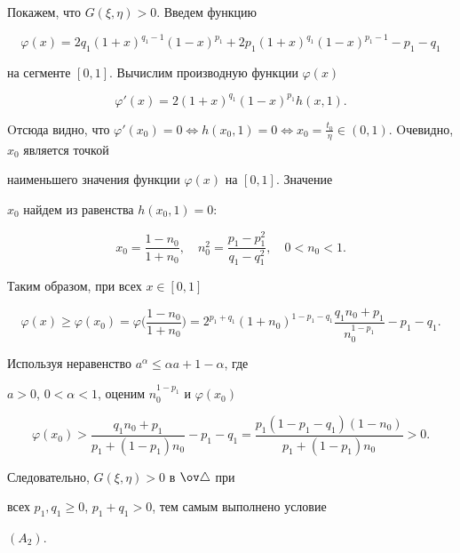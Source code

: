 Покажем, что $G(\xi,\eta)>0$. Введем функцию


$$


\varphi(x)=2q_1(1+x)^{q_1-1}(1-x)^{p_1}+


2p_1(1+x)^{q_1}(1-x)^{p_1-1}-p_1-q_1


$$


на сегменте $[0,1]$. Вычислим производную функции $\varphi (x)$


$$


\varphi' (x)=2(1+x)^{q_1}(1-x)^{p_1}h(x,1).


$$


Oтсюда видно, что $\varphi '(x_0)=0\Longleftrightarrow h(x_0,1)=0


\Longleftrightarrow


x_0=\frac{t_0}{\eta }\in (0,1)$. Oчевидно, $x_0$ является точкой 


наименьшего значения функции $\varphi (x)$ на $[0,1]$. Значение 


$x_0$ найдем из равенства $h(x_0,1)=0$:


$$


x_0=\frac{1-n_0}{1+n_0},\quad 


n_0^2=\frac{p_1-p_1^2}{q_1-q_1^2},\quad 0<n_0<1.


$$


Таким образом, при всех $x\in [0,1]$


$$


\varphi (x)\ge\varphi (x_0)=\varphi \bigg 


(\frac{1-n_0}{1+n_0}\bigg)=


2^{p_1+q_1}(1+n_0)^{1-p_1-q_1}


\frac{q_1n_0+p_1}{n_0^{1-p_1}}-p_1-q_1.


$$


Используя неравенство $a^{\alpha}\le\alpha a+1-\alpha$, где 


$a>0$, $0<\alpha <1$, оценим $n_0^{1-p_1}$ и $\varphi (x_0)$


$$


\varphi 


(x_0)>\frac{q_1n_0+p_1}{p_1+(1-p_1)n_0}-p_1-q_1=\frac{p_1(1-p_1-q_1)(1-n_0) 


}{p_1+(1-p_1)n_0}>0.


$$


Следовательно, $G(\xi,\eta)>0$ в $\ov \triangle$ при 


всех $p_1,q_1\ge 0$, $p_1+q_1>0$, тем самым выполнено условие 


$(A_2)$.





